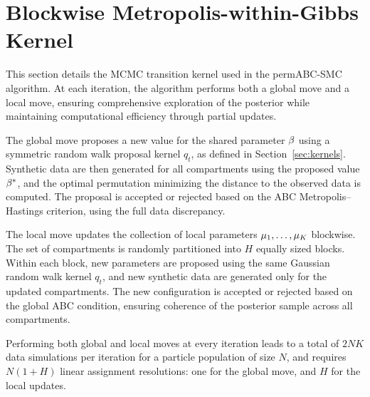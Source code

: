 


\section{Blockwise Metropolis-within-Gibbs Kernel}
\label{appendix_kernel}

This section details the MCMC transition kernel used in the permABC-SMC algorithm. At each iteration, the algorithm performs both a global move and a local move, ensuring comprehensive exploration of the posterior while maintaining computational efficiency through partial updates.

The global move proposes a new value for the shared parameter \( \beta \) using a symmetric random walk proposal kernel \( q_t \), as defined in Section~\ref{sec:kernels}. Synthetic data are then generated for all compartments using the proposed value \( \beta^* \), and the optimal permutation minimizing the distance to the observed data is computed. The proposal is accepted or rejected based on the ABC Metropolis–Hastings criterion, using the full data discrepancy.

The local move updates the collection of local parameters \( \mu_1, \dots, \mu_K \) blockwise. The set of compartments is randomly partitioned into \( H \) equally sized blocks. Within each block, new parameters are proposed using the same Gaussian random walk kernel \( q_t \), and new synthetic data are generated only for the updated compartments. The new configuration is accepted or rejected based on the global ABC condition, ensuring coherence of the posterior sample across all compartments.

Performing both global and local moves at every iteration leads to a total of \( 2NK \) data simulations per iteration for a particle population of size \( N \), and requires \( N(1 + H) \) linear assignment resolutions: one for the global move, and \( H \) for the local updates.

